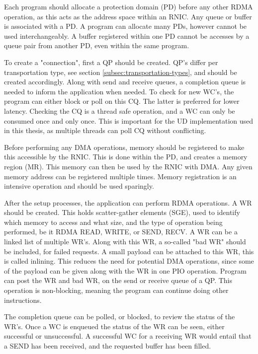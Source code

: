 Each program should allocate a protection domain (PD) before any other RDMA operation, as this acts as the address space within an RNIC.
Any queue or buffer is associated with a PD.
A program can allocate many PDs, however cannot be used interchangeably.
A buffer registered within one PD cannot be accesses by a queue pair from another PD, even within the same program.

To create a "connection", first a QP should be created.
QP's differ per transportation type, see section \ref{subsec:transportation-types}, and should be created accordingly.
Along with send and receive queues, a completion queue is needed to inform the application when needed.
To check for new WC's, the program can either block or poll on this CQ.
The latter is preferred for lower latency.
Checking the CQ is a thread safe operation, and a WC can only be consumed once and only once.
This is important for the UD implementation used in this thesis, as multiple threads can poll CQ without conflicting.

Before performing any DMA operations, memory should be registered to make this accessible by the RNIC.
This is done within the PD, and creates a memory region (MR).
This memory can then be used by the RNIC with DMA.
Any given memory address can be registered multiple times.
Memory registration is an intensive operation and should be used sparingly.

After the setup processes, the application can perform RDMA operations.
A WR should be created.
This holds scatter-gather elements (SGE), used to identify which memory to access and what size, and the type of operation being performed, be it RDMA READ, WRITE, or SEND, RECV.
A WR can be a linked list of multiple WR's.
Along with this WR, a so-called "bad WR" should be included, for failed requests.
A small payload can be attached to this WR, this is called inlining.
This reduces the need for potential DMA operations, since some of the payload can be given along with the WR in one PIO operation.
Program can post the WR and bad WR, on the send or receive queue of a QP.
This operation is non-blocking, meaning the program can continue doing other instructions.

The completion queue can be polled, or blocked, to review the status of the WR's.
Once a WC is enqueued the status of the WR can be seen, either successful or unsuccessful.
A successful WC for a receiving WR would entail that a SEND has been received, and the requested buffer has been filled.








